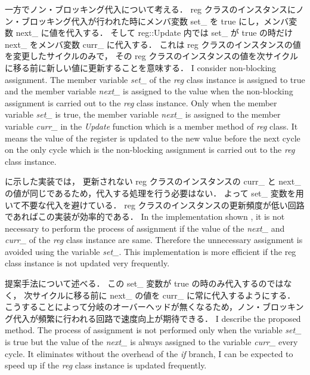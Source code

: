 一方でノン・ブロッキング代入について考える．
reg クラスのインスタンスにノン・ブロッキング代入が行われた時にメンバ変数 set\_ を true にし，メンバ変数 next\_ に値を代入する．
そして reg::Update 内では set\_ が true の時だけ next\_ をメンバ変数 curr\_ に代入する．
これは reg クラスのインスタンスの値を変更したサイクルのみで，
その reg クラスのインスタンスの値を次サイクルに移る前に新しい値に更新することを意味する．
\fi
I consider non-blocking assignment.
The member variable \textit{set\_} of the \textit{reg} class instance is assigned to true
and the member variable \textit{next\_} is assigned to the value
when the non-blocking assignment is carried out to the \textit{reg} class instance.
Only when the member variable \textit{set\_} is true, the member variable \textit{next\_} is assigned to the member variable \textit{curr\_} in the \textit{Update} function which is a member method of \textit{reg} class.
It means the value of the register is updated to the new value before the next cycle on the only cycle which is the non-blocking assignment is carried out to the \textit{reg} class instance.

 に示した実装では，
更新されない reg クラスのインスタンスの curr\_ と next\_ の値が同じであるため，代入する処理を行う必要はない．
よって set\_ 変数を用いて不要な代入を避けている．
reg クラスのインスタンスの更新頻度が低い回路であればこの実装が効率的である．
\fi
In the implementation shown ,
it is not necessary to perform the process of assignment
if the value of the \textit{next\_} and \textit{curr\_} of the \textit{reg} class instance are same.
Therefore the unnecessary assignment is avoided using the variable \textit{set\_}.
This implementation is more efficient if the reg class instance is not updated very frequently.

提案手法について述べる．
この set\_ 変数が true の時のみ代入するのではなく，
次サイクルに移る前に next\_ の値を curr\_ に常に代入するようにする．
こうすることによって分岐のオーバーヘッドが無くなるため，ノン・ブロッキング代入が頻繁に行われる回路で速度向上が期待できる．
\fi
I describe the proposed method.
The process of assignment is not performed only when the variable \textit{set\_} is true
but the value of the \textit{next\_} is always assigned to the variable \textit{curr\_} every cycle.
It eliminates without the overhead of the \textit{if} branch,
I can be expected to speed up if the \textit{reg} class instance is updated frequently.


